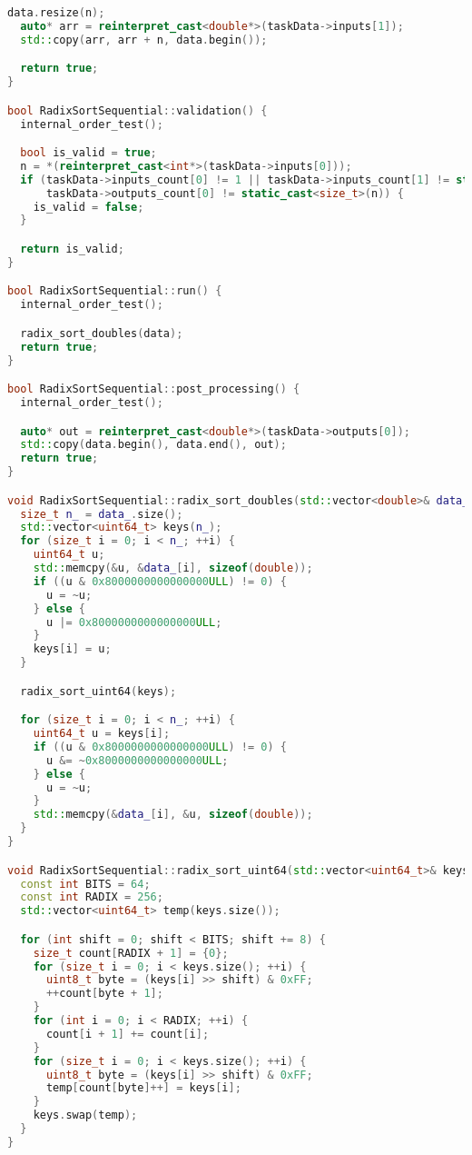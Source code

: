 \documentclass[a4paper,12pt]{article}
\begin{document}
\begin{lstlisting}[language=C++, caption={Реализация}]
  data.resize(n);
  auto* arr = reinterpret_cast<double*>(taskData->inputs[1]);
  std::copy(arr, arr + n, data.begin());

  return true;
}

bool RadixSortSequential::validation() {
  internal_order_test();

  bool is_valid = true;
  n = *(reinterpret_cast<int*>(taskData->inputs[0]));
  if (taskData->inputs_count[0] != 1 || taskData->inputs_count[1] != static_cast<size_t>(n) ||
      taskData->outputs_count[0] != static_cast<size_t>(n)) {
    is_valid = false;
  }

  return is_valid;
}

bool RadixSortSequential::run() {
  internal_order_test();

  radix_sort_doubles(data);
  return true;
}

bool RadixSortSequential::post_processing() {
  internal_order_test();

  auto* out = reinterpret_cast<double*>(taskData->outputs[0]);
  std::copy(data.begin(), data.end(), out);
  return true;
}

void RadixSortSequential::radix_sort_doubles(std::vector<double>& data_) {
  size_t n_ = data_.size();
  std::vector<uint64_t> keys(n_);
  for (size_t i = 0; i < n_; ++i) {
    uint64_t u;
    std::memcpy(&u, &data_[i], sizeof(double));
    if ((u & 0x8000000000000000ULL) != 0) {
      u = ~u;
    } else {
      u |= 0x8000000000000000ULL;
    }
    keys[i] = u;
  }

  radix_sort_uint64(keys);

  for (size_t i = 0; i < n_; ++i) {
    uint64_t u = keys[i];
    if ((u & 0x8000000000000000ULL) != 0) {
      u &= ~0x8000000000000000ULL;
    } else {
      u = ~u;
    }
    std::memcpy(&data_[i], &u, sizeof(double));
  }
}

void RadixSortSequential::radix_sort_uint64(std::vector<uint64_t>& keys) {
  const int BITS = 64;
  const int RADIX = 256;
  std::vector<uint64_t> temp(keys.size());

  for (int shift = 0; shift < BITS; shift += 8) {
    size_t count[RADIX + 1] = {0};
    for (size_t i = 0; i < keys.size(); ++i) {
      uint8_t byte = (keys[i] >> shift) & 0xFF;
      ++count[byte + 1];
    }
    for (int i = 0; i < RADIX; ++i) {
      count[i + 1] += count[i];
    }
    for (size_t i = 0; i < keys.size(); ++i) {
      uint8_t byte = (keys[i] >> shift) & 0xFF;
      temp[count[byte]++] = keys[i];
    }
    keys.swap(temp);
  }
}


\end{lstlisting}
\end{document}
